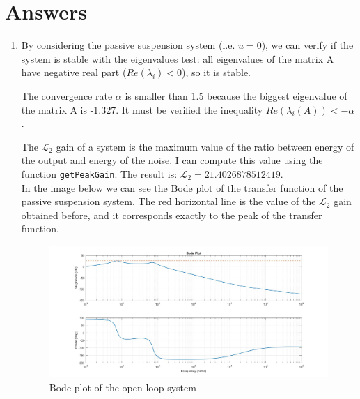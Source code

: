 \documentclass[11pt,a4paper]{article}
\begin{document}
\section{Answers}
\begin{enumerate}
	\item By considering the passive suspension system (i.e. $u=0$), we can verify if the system is stable with the eigenvalues test: all eigenvalues of the matrix A have negative real part ($Re(\lambda_i) < 0$), so it is stable.
	
	\smallskip
	 
	The convergence rate $\alpha$ is smaller than 1.5 because the biggest eigenvalue of the matrix A is -1.327. It must be verified the inequality $Re(\lambda_i(A)) < -\alpha$.
	
	\smallskip
	
	The $\mathcal{L}_2$ gain of a system is the maximum value of the ratio between  energy of the output and energy of the noise. I can compute this value using the function \texttt{getPeakGain}. The result is: $\mathcal{L}_2=21.4026878512419$. \\
	In the image below we can see the Bode plot of the transfer function of the passive suspension system. The red horizontal line is the value of the $\mathcal{L}_2$ gain obtained before, and it corresponds exactly to the peak of the transfer function. 
	
	\smallskip
	
	\begin{figure}[H]
		\centering
		\includegraphics[width=150mm]{plots/gamma_peak.jpg}
		\caption{Bode plot of the open loop system}
		\label{fig:1}
	\end{figure}
	
	\medskip
	

\end{enumerate}
\end{document}
